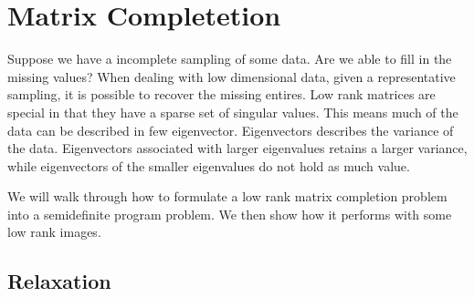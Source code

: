 \documentclass{article}
\begin{document}


\newpage 
\section{Matrix Completetion}




Suppose we have a incomplete sampling of some data. Are we able to fill in the missing values? 
When dealing with low dimensional data, given a representative sampling, it is possible to recover the missing entires. 
Low rank matrices are special in that they have a sparse set of singular values. This means much 
of the data can be described in few eigenvector. 
Eigenvectors describes the variance of the data. Eigenvectors associated with larger eigenvalues 
retains a larger variance, while eigenvectors of the smaller eigenvalues do not hold as much value. 


We will walk through how to formulate a low rank matrix completion problem into a semidefinite program problem.
We then show how it performs with some low rank images. 

\subsection{Relaxation}
\end{document}
